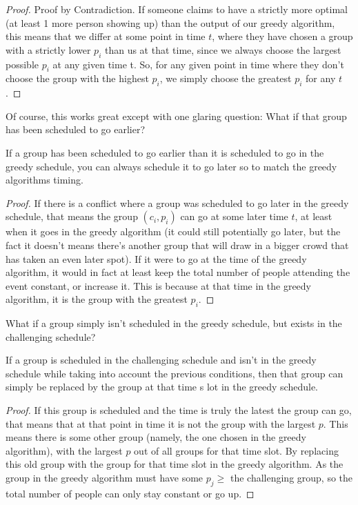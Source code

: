 \documentclass[11pt]{article}
\begin{document}
\begin{proof} Proof by Contradiction. If someone claims to have a strictly more optimal (at least 1 more person showing up) than the output of our greedy algorithm, this means that we differ at some point in time $t$, where they have chosen a group with a strictly lower $p_i$ than us at that time, since we always choose the largest possible $p_i$ at any given time t. So, for any given point in time where they don't choose the group with the highest $p_i$, we simply choose the greatest $p_i$ for any $t$.
\end{proof}

Of course, this works great except with one glaring question: What if that group has been scheduled to go earlier?

\begin{claim*}If a group has been scheduled to go earlier than it is scheduled to go in the greedy schedule, you can always schedule it to go later so to match the greedy algorithms timing.\end{claim*}
\begin{proof}If there is a conflict where a group was scheduled to go later in the greedy schedule, that means the group $(c_i, p_i)$ can go at some later time $t$, at least when it goes in the greedy algorithm (it could still potentially go later, but the fact it doesn't means there's another group that will draw in a bigger crowd that has taken an even later spot). If it were to go at the time of the greedy algorithm, it would in fact at least keep the total number of people attending the event constant, or increase it. This is because at that time in the greedy algorithm, it is the group with the greatest $p_i$.\end{proof}

What if a group simply isn't scheduled in the greedy schedule, but exists in the challenging schedule?

\begin{claim*}If a group is scheduled in the challenging schedule and isn't in the greedy schedule while taking into account the previous conditions, then that group can simply be replaced by the group at that time s lot in the greedy schedule.\end{claim*}

\begin{proof}If this group is scheduled and the time is truly the latest the group can go, that means that at that point in time it is not the group with the largest $p$. This means there is some other group (namely, the one chosen in the greedy algorithm), with the largest $p$ out of all groups for that time slot. By replacing this old group with the group for that time slot in the greedy algorithm. As the group in the greedy algorithm must have some $p_j \geq$ the challenging group, so the total number of people can only stay constant or go up.\end{proof}
\end{document}
